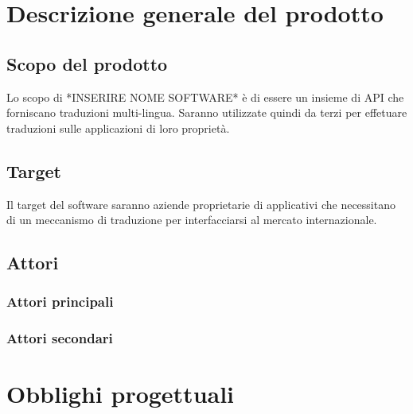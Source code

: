 \section{Descrizione generale del prodotto}
\subsection{Scopo del prodotto}
Lo scopo di *INSERIRE NOME SOFTWARE* è di essere un insieme di API che forniscano traduzioni multi-lingua. Saranno utilizzate quindi da terzi per effetuare traduzioni sulle applicazioni di loro proprietà.
\subsection{Target}
Il target del software saranno aziende proprietarie di applicativi che necessitano di un meccanismo di traduzione per interfacciarsi al mercato internazionale.
\subsection{Attori}
\subsubsection{Attori principali}
\subsubsection{Attori secondari}
\section{Obblighi progettuali}